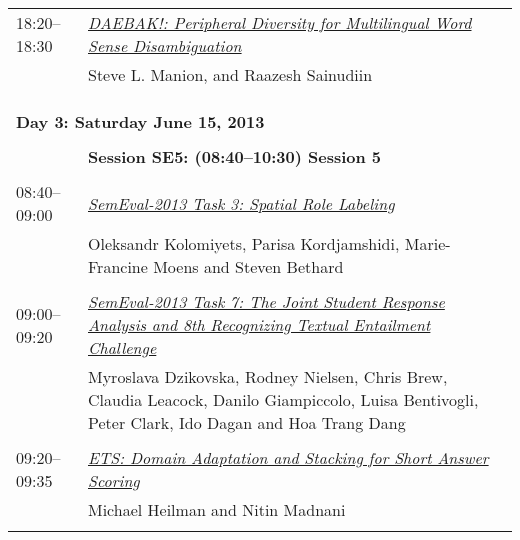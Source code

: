 \begin{tabular}{p{20mm}p{138mm}}
18:20--18:30  & \hyperlink{page.250}{\em DAEBAK!: Peripheral Diversity for Multilingual Word Sense Disambiguation}\\
         & Steve L. Manion,  and Raazesh Sainudiin \\
\\

 & {\bf \newpage} \\
\\
\multicolumn{2}{l}{\bf Day 3: Saturday June 15, 2013} \\
\\
 & {\bf Session SE5: (08:40--10:30) Session 5} \\
\\
08:40--09:00 & \hyperlink{page.255}{\em SemEval-2013 Task 3: Spatial Role Labeling}\\
         & Oleksandr Kolomiyets, Parisa Kordjamshidi, Marie-Francine Moens and Steven Bethard \\
\\

09:00--09:20 & \hyperlink{page.263}{\em SemEval-2013 Task 7: The Joint Student Response Analysis and 8th Recognizing Textual Entailment Challenge}\\
         & Myroslava Dzikovska, Rodney Nielsen, Chris Brew, Claudia Leacock, Danilo Giampiccolo, Luisa Bentivogli, Peter Clark, Ido Dagan and Hoa Trang Dang \\
\\

09:20--09:35 & \hyperlink{page.275}{\em ETS: Domain Adaptation and Stacking for Short Answer Scoring}\\
         & Michael Heilman and Nitin Madnani \\
\\


\end{tabular}
\newpage
